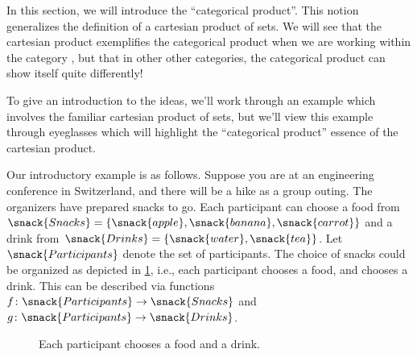 

%


In this section, we will introduce the ``categorical product''.
This notion generalizes the definition of a cartesian product of sets.
We will see that the cartesian product exemplifies the categorical product when we are working within the category \Set, but that in other other categories, the categorical product can show itself quite differently!

To give an introduction to the ideas, we'll work through an example which involves the familiar cartesian product of sets, but we'll view this example through eyeglasses which will highlight the ``categorical product'' essence of the cartesian product.

Our introductory example is as follows.
Suppose you are at an engineering conference in Switzerland, and there will be a hike as a group outing.
The organizers have prepared snacks to go.
Each participant can choose a food from~$\snack{Snacks}=\{\snack{apple},\snack{banana},\snack{carrot}\}$ and a drink from~$\snack{Drinks}=\{\snack{water},\snack{tea}\}$.
Let~$\snack{Participants}$ denote the set of participants.
The choice of snacks could be organized as depicted in \cref{fig:snacks_1}, i.e., each participant chooses a food, and chooses a drink.
This can be described via functions~$f\colon \snack{Participants} \to \snack{Snacks}$ and~$g\colon  \snack{Participants} \to \snack{Drinks}$.

\begin{figure}[h!]
  \begin{center}
  \end{center}
  \caption{Each participant chooses a food and a drink.}
  \label{fig:snacks_1}
\end{figure}

